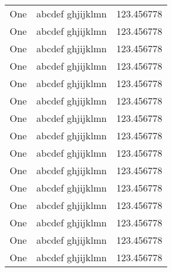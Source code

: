 \documentclass[a11paper]{article}
\begin{document}
\begin{center}
\begin{longtable}{lll}
		One                                                & abcdef ghjijklmn                           & 123.456778                                \\
		One                                                & abcdef ghjijklmn                           & 123.456778                                \\
		One                                                & abcdef ghjijklmn                           & 123.456778                                \\
		One                                                & abcdef ghjijklmn                           & 123.456778                                \\
		One                                                & abcdef ghjijklmn                           & 123.456778                                \\
		One                                                & abcdef ghjijklmn                           & 123.456778                                \\
		One                                                & abcdef ghjijklmn                           & 123.456778                                \\
		One                                                & abcdef ghjijklmn                           & 123.456778                                \\
		One                                                & abcdef ghjijklmn                           & 123.456778                                \\
		One                                                & abcdef ghjijklmn                           & 123.456778                                \\
		One                                                & abcdef ghjijklmn                           & 123.456778                                \\
		One                                                & abcdef ghjijklmn                           & 123.456778                                \\
		One                                                & abcdef ghjijklmn                           & 123.456778                                \\
		One                                                & abcdef ghjijklmn                           & 123.456778                                \\
		One                                                & abcdef ghjijklmn                           & 123.456778                                \\

\end{longtable}
\end{center}
\end{document}
